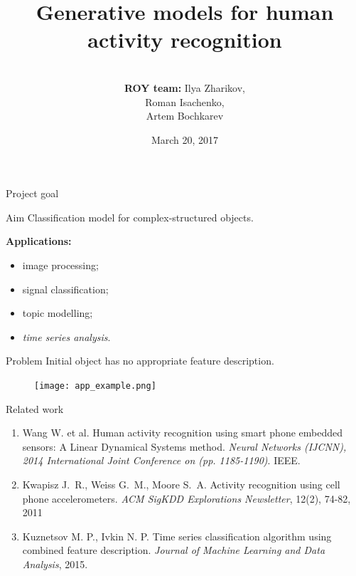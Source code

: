 \documentclass{beamer}
\title[\hbox to 56mm{Human Activity Recognition  \hfill\insertframenumber\,/\,\inserttotalframenumber}]
{Generative models for human activity recognition}
\author[ROY team]{\\
	{\small \textbf{ROY team:} Ilya Zharikov, \\ \hspace{2.67cm}Roman Isachenko, \\ \hspace{2.61cm}Artem Bochkarev}}
\institute[SkolTech]{Skolkovo Institute of Science and Technology \\
	Machine Learning course 
	\vspace{0.3cm}
}
\date{March 20, 2017}
\begin{document}
	\begin{frame}
		\titlepage
	\end{frame}
\begin{frame}{Project goal}
		
		\begin{minipage}[t]{0.45\columnwidth}
			\begin{block}{Aim}
				Classification model for complex-structured objects.
			\end{block}
			
			\vspace{1.5cm}
			
			\textbf{Applications:}
			\begin{itemize}
				\item image processing;
				\item signal classification;
				\item topic modelling;
				\item \textit{time series analysis}.
			\end{itemize}
		\end{minipage}
		\hfill
		\begin{minipage}[t]{0.45\columnwidth}
			\begin{block}{Problem}
				Initial object has no appropriate feature description.
			\end{block}
			\begin{figure}[h]
				\centering
				\texttt{[image: app\_example.png]}
				\label{ts_example}
			\end{figure}
		\end{minipage}
		
\end{frame}
\begin{frame}{Related work}
	\begin{enumerate}
		\item Wang W. et al. Human activity recognition using smart phone embedded sensors: A Linear Dynamical Systems method. \emph{Neural Networks (IJCNN), 2014 International Joint Conference on (pp. 1185-1190)}. IEEE.
		\vspace{\baselineskip}
		\item Kwapisz J.~R., Weiss G.~M., Moore S.~A. Activity recognition using cell phone accelerometers. \emph{ACM SigKDD Explorations Newsletter}, 12(2), 74-82, 2011
		\vspace{\baselineskip}
		\item Kuznetsov M. P., Ivkin N. P. Time series classification algorithm using combined feature description. \emph{Journal of Machine Learning and Data Analysis}, 2015.
	\end{enumerate}
	
\end{frame}
\end{document}
